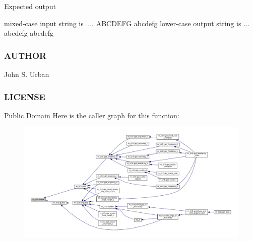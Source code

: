 Expected output

mixed-\/case input string is .... A\+B\+C\+D\+E\+FG abcdefg lower-\/case output string is ... abcdefg abcdefg \subsubsection*{A\+U\+T\+H\+OR}

John S. Urban \subsubsection*{L\+I\+C\+E\+N\+SE}

Public Domain Here is the caller graph for this function\+:
\nopagebreak
\begin{figure}[H]
\begin{center}
\leavevmode
\includegraphics[width=350pt]{namespacem__cli2_a6d2d93ab8471667e632bf7a0e95ebd13_icgraph}
\end{center}
\end{figure}
\mbox{\label{namespacem__cli2_a2d1a2b245e9a5e5897e5bff0afc2a217}} 

